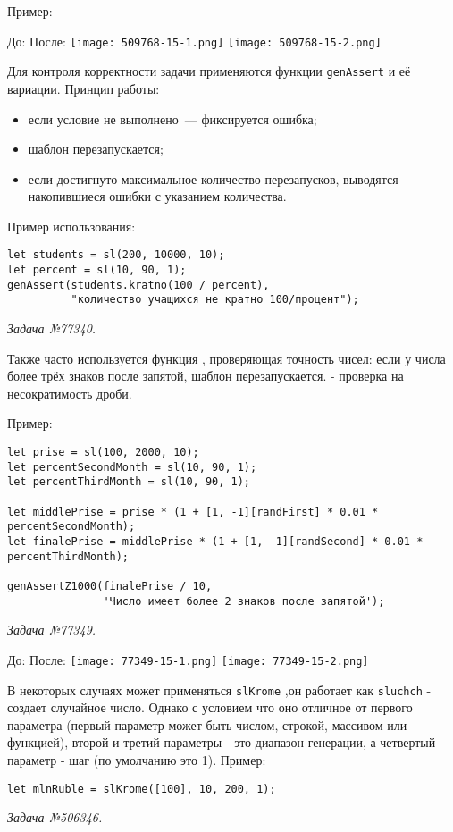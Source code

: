 Пример: 

До: 
После: 
\texttt{[image: 509768-15-1.png]}  
\texttt{[image: 509768-15-2.png]}  

Для контроля корректности задачи применяются функции \texttt{genAssert} и её вариации. Принцип работы:  
\begin{itemize}
    \item если условие не выполнено~--- фиксируется ошибка;
    \item шаблон перезапускается;
    \item если достигнуто максимальное количество перезапусков, выводятся накопившиеся ошибки с указанием количества.
\end{itemize}

Пример использования:
\begin{lstlisting}
let students = sl(200, 10000, 10);
let percent = sl(10, 90, 1); 
genAssert(students.kratno(100 / percent),
          "количество учащихся не кратно 100/процент");
\end{lstlisting}
\textsl{Задача №77340.}

Также часто используется функция , проверяющая точность чисел: если у числа более трёх знаков после запятой, шаблон перезапускается.  
 - проверка на несократимость дроби.

Пример:
\begin{lstlisting}
let prise = sl(100, 2000, 10);
let percentSecondMonth = sl(10, 90, 1);
let percentThirdMonth = sl(10, 90, 1);

let middlePrise = prise * (1 + [1, -1][randFirst] * 0.01 * percentSecondMonth);
let finalePrise = middlePrise * (1 + [1, -1][randSecond] * 0.01 * percentThirdMonth);

genAssertZ1000(finalePrise / 10,
               'Число имеет более 2 знаков после запятой');
\end{lstlisting}
\textsl{Задача №77349.}


До:
После:
\texttt{[image: 77349-15-1.png]}
\texttt{[image: 77349-15-2.png]}

В некоторых случаях может применяться \texttt{slKrome} ,он работает как \texttt{sluchch} - создает случайное число. Однако с условием что оно  отличное от
		первого параметра (первый параметр может быть числом, строкой, массивом или функцией),
		второй и третий параметры - это диапазон генерации, а четвертый параметр - шаг (по умолчанию это 1).
Пример:
\begin{lstlisting}
let mlnRuble = slKrome([100], 10, 200, 1);
\end{lstlisting}
\textsl{Задача №506346.}

